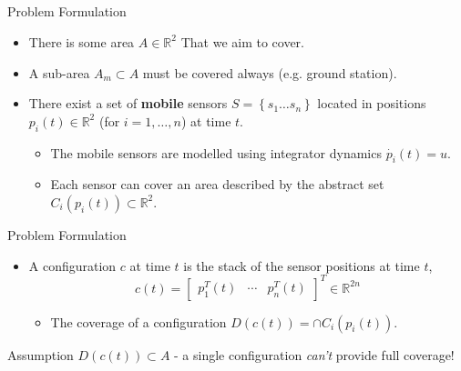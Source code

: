 \documentclass[t]{beamer}
\newcommand{\rR}{\mathbb{R}}
\newcommand{\bmat}[1]{\begin{bmatrix}#1\end{bmatrix}}
\begin{document}
\subsection[Problem Formulation]{}
\begin{frame}[label=probformulation1]{Problem Formulation}
\begin{itemize}
\item There is some area $A \in \rR^{2}$ That we aim to cover.
\item A sub-area $A_{m} \subset A$ must be covered always (e.g. ground station).
\item There exist a set of \textbf{mobile} sensors $S = \left\{s_1 \ldots s_n\right\}$ located in positions $p_i(t) \in \mathbb{R}^2$ (for $i=1,\ldots,n$) at time $t$.
\begin{itemize}
\item The mobile sensors are modelled using integrator dynamics $\dot{p_i}(t) = u$.
\item Each sensor can cover an area described by the abstract set $C_i(p_i(t)) \subset \mathbb{R}^2$.
\end{itemize}
\end{itemize}
\end{frame}
\begin{frame}[label=probformulation2]{Problem Formulation}
\begin{itemize}
\item A configuration $c$ at time $t$ is the stack of the sensor positions at time $t$,
\begin{equation*}
c\left(t\right) = \bmat{
p_{1}^{T}\left(t\right)&\cdots&p_{n}^{T}\left(t\right)}^{T}\in\mathbb{R}^{2n}
\end{equation*}
\begin{itemize}
\item The coverage of a configuration $D\left( c\left( t \right) \right) = \cap C_i(p_i(t))$.
\end{itemize}
\end{itemize}
\begin{block}{Assumption}
$D\left( c\left( t \right) \right) \subset A$ - a single configuration \emph{can't} provide full coverage!
\end{block}
\end{frame}
\end{document}
